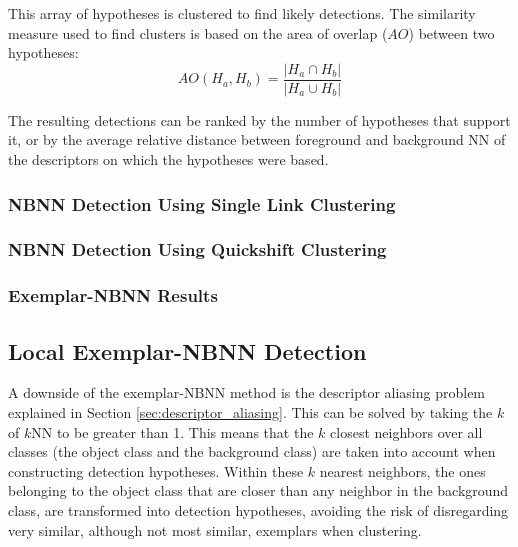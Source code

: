 This array of hypotheses is clustered to find likely detections. The similarity measure used to find clusters is based on the area of overlap ($AO$) between two hypotheses:
\begin{equation}
    AO(H_a, H_b)= \frac{|H_a\cap H_b|}{|H_a\cup H_b|}
\end{equation}

The resulting detections can be ranked by the number of hypotheses that support it, or by the average relative distance between foreground and background NN of the descriptors on which the hypotheses were based.

\subsubsection{NBNN Detection Using Single Link Clustering} %
\label{sub:nbnn_detection_using_single_link_clustering}



\subsubsection{NBNN Detection Using Quickshift Clustering} %
\label{sub:nbnn_detection_using_quickshift_clustering}



\subsubsection{Exemplar-NBNN Results} %
\label{sub:exemplar_nbnn_results}
\begin{figure}[hbt]
    \centering
\end{figure}



\subsection{Local Exemplar-NBNN Detection} %
\label{sec:local_nbnn_detection}
A downside of the exemplar-NBNN method is the descriptor aliasing problem explained in Section \ref{sec:descriptor_aliasing}. This can be solved by taking the $k$ of $k$NN to be greater than 1. This means that the $k$ closest neighbors over all classes (the object class and the background class) are taken into account when constructing detection hypotheses. Within these $k$ nearest neighbors, the ones belonging to the object class that are closer than any neighbor in the background class, are transformed into detection hypotheses, avoiding the risk of disregarding very similar, although not most similar, exemplars when clustering.

